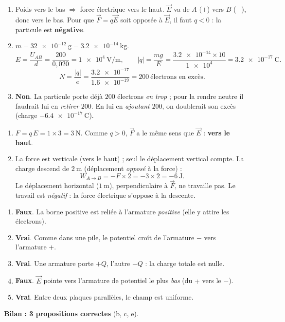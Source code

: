 \documentclass[11pt,a4paper]{article}
\newcommand{\vv}[1]{\vec{#1}}\newcommand{\ds}{\displaystyle}
\begin{document}

\begin{corrige}
\begin{enumerate}[label=\alph*)]
  \item Poids vers le bas $\Rightarrow$ force électrique vers le haut. $\vv{E}$ va de $A$ ($+$) vers
        $B$ ($-$), donc vers le bas. Pour que $\vv{F}=q\vv{E}$ soit opposée à $\vv{E}$, il faut
        $q<0$ : la particule est \textbf{négative}.
  \item $m = \SI{32e-12}{\gram} = \SI{3.2e-14}{\kilogram}$.
        \[ E = \frac{U_{AB}}{d} = \frac{200}{0{,}020} = \SI{1e4}{\volt\per\metre}, \qquad
           |q| = \frac{m g}{E} = \frac{\num{3.2e-14}\times 10}{\num{1e4}} = \SI{3.2e-17}{\coulomb}. \]
        \[ N = \frac{|q|}{e} = \frac{\num{3.2e-17}}{\num{1.6e-19}} = 200\ \text{électrons en excès}. \]
  \item \textbf{Non}. La particule porte déjà $200$ électrons \emph{en trop} ; pour la rendre neutre
        il faudrait lui en \emph{retirer} $200$. En lui en \emph{ajoutant} $200$, on doublerait son
        excès (charge $\SI{-6.4e-17}{\coulomb}$).
\end{enumerate}
\end{corrige}

\begin{corrige}
\begin{enumerate}[label=\alph*)]
  \item $F = q\,E = 1\times 3 = \SI{3}{\newton}$. Comme $q>0$, $\vv{F}$ a le même sens que $\vv{E}$ :
        \textbf{vers le haut}.
  \item La force est verticale (vers le haut) ; seul le déplacement vertical compte. La charge
        descend de $\SI{2}{\metre}$ (déplacement \emph{opposé} à la force) :
        \[ W_{A\to B} = -F\times 2 = -3\times 2 = \SI{-6}{\joule}. \]
        Le déplacement horizontal ($\SI{1}{\metre}$), perpendiculaire à $\vv{F}$, ne travaille pas.
        Le travail est \emph{négatif} : la force électrique s'oppose à la descente.
\end{enumerate}
\end{corrige}

\begin{corrige}
\begin{enumerate}[label=\alph*)]
  \item \textbf{Faux}. La borne positive est reliée à l'armature \emph{positive} (elle y attire les
        électrons).
  \item \textbf{Vrai}. Comme dans une pile, le potentiel croît de l'armature $-$ vers l'armature $+$.
  \item \textbf{Vrai}. Une armature porte $+Q$, l'autre $-Q$ : la charge totale est nulle.
  \item \textbf{Faux}. $\vv{E}$ pointe vers l'armature de potentiel le plus \emph{bas} (du $+$ vers
        le $-$).
  \item \textbf{Vrai}. Entre deux plaques parallèles, le champ est uniforme.
\end{enumerate}
\textbf{Bilan : 3 propositions correctes} (b, c, e).
\end{corrige}
\end{document}
